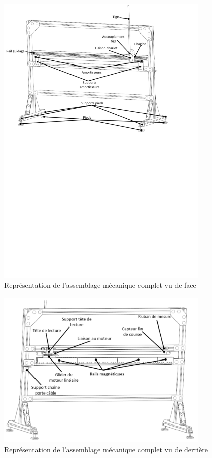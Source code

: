 \begin{figure}[H]
    \centering
    \includegraphics[width = 0.9\textwidth]{assets/figures/AssemblageCompletFace.svg}
    \caption{Représentation de l'assemblage mécanique complet vu de face}
    \label{fig:AssCompFace}
\end{figure}

\begin{figure}[H]
    \centering
    \includegraphics[width = 0.9\textwidth]{assets/figures/AssemblageCompletDerriere.svg}
    \caption{Représentation de l'assemblage mécanique complet vu de derrière}
    \label{fig:AssCompDerriere}
\end{figure}